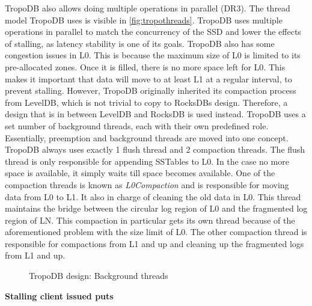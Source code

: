 TropoDB also allows doing multiple operations in parallel (DR3). The thread model TropoDB uses is visible in \autoref{fig:tropothreads}. TropoDB uses multiple operations in parallel to match the concurrency of the SSD and lower the effects of stalling, as latency stability is one of its goals. TropoDB also has some congestion issues in L0. This is because the maximum size of L0 is limited to its pre-allocated zones. Once it is filled, there is no more space left for L0. This makes it important that data will move to at least L1 at a regular interval, to prevent stalling. However, TropoDB originally inherited its compaction process from LevelDB, which is not trivial to copy to RocksDBs design. Therefore, a design that is in between LevelDB and RocksDB is used instead. TropoDB uses a set number of background threads, each with their own predefined role. Essentially, preemption and background threads are moved into one concept. TropoDB always uses exactly 1 flush thread and 2 compaction threads. The flush thread is only responsible for appending SSTables to L0. In the case no more space is available, it simply waits till space becomes available. One of the compaction threads is known as \textit{L0Compaction} and is responsible for moving data from L0 to L1. It also in charge of cleaning the old data in L0. This thread maintains the bridge between the circular log region of L0 and the fragmented log region of LN. This compaction in particular gets its own thread because of the aforementioned problem with the size limit of L0.  The other compaction thread is responsible for compactions from L1 and up and cleaning up the fragmented logs from L1 and up.\\
\begin{figure}[h]
\centering
\begin{minipage}{0.75\textwidth}
  \centering
  
\end{minipage}%
\caption{ TropoDB design: Background threads }
\label{fig:tropothreads}
\end{figure}
\textbf{Stalling client issued puts}
\label{sec:stalling}
